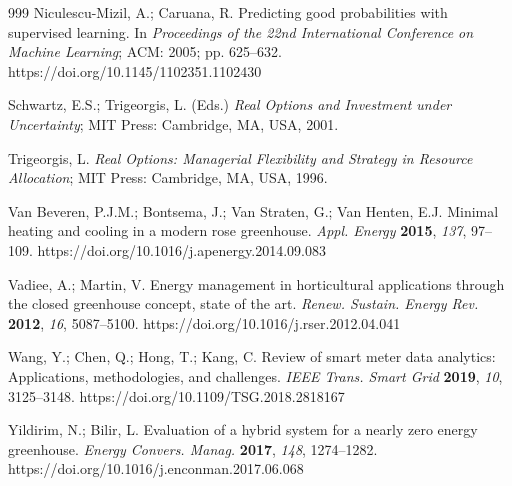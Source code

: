 \documentclass[agriengineering,article,submit,pdftex,moreauthors]{Definitions/mdpi}
\begin{document}
\begin{thebibliography}{999}
Niculescu-Mizil, A.; Caruana, R. Predicting good probabilities with supervised learning. In \emph{Proceedings of the 22nd International Conference on Machine Learning}; ACM: 2005; pp. 625--632. https://doi.org/10.1145/1102351.1102430

Schwartz, E.S.; Trigeorgis, L. (Eds.) \emph{Real Options and Investment under Uncertainty}; MIT Press: Cambridge, MA, USA, 2001.

Trigeorgis, L. \emph{Real Options: Managerial Flexibility and Strategy in Resource Allocation}; MIT Press: Cambridge, MA, USA, 1996.

Van Beveren, P.J.M.; Bontsema, J.; Van Straten, G.; Van Henten, E.J. Minimal heating and cooling in a modern rose greenhouse. \emph{Appl. Energy} \textbf{2015}, \emph{137}, 97--109. https://doi.org/10.1016/j.apenergy.2014.09.083

Vadiee, A.; Martin, V. Energy management in horticultural applications through the closed greenhouse concept, state of the art. \emph{Renew. Sustain. Energy Rev.} \textbf{2012}, \emph{16}, 5087--5100. https://doi.org/10.1016/j.rser.2012.04.041

Wang, Y.; Chen, Q.; Hong, T.; Kang, C. Review of smart meter data analytics: Applications, methodologies, and challenges. \emph{IEEE Trans. Smart Grid} \textbf{2019}, \emph{10}, 3125--3148. https://doi.org/10.1109/TSG.2018.2818167

Yildirim, N.; Bilir, L. Evaluation of a hybrid system for a nearly zero energy greenhouse. \emph{Energy Convers. Manag.} \textbf{2017}, \emph{148}, 1274--1282. https://doi.org/10.1016/j.enconman.2017.06.068

\end{thebibliography}
\end{document}
